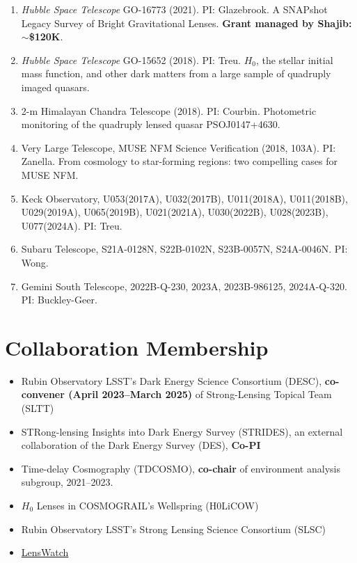\documentclass[margin, line]{res}
\begin{document}
\begin{resume}
\begin{enumerate}
\item \textit{Hubble Space Telescope} GO-16773 (2021). PI: Glazebrook. A SNAPshot Legacy Survey of Bright Gravitational Lenses. \textbf{Grant managed by Shajib: $\sim$\$120K}.
\item \textit{Hubble Space Telescope} GO-15652 (2018). PI: Treu. $H_0$, the stellar initial mass function, and other dark matters from a large sample of quadruply imaged quasars.
\item 2-m Himalayan Chandra Telescope (2018). PI: Courbin. Photometric monitoring of the quadruply lensed quasar PSOJ0147+4630.
\item Very Large Telescope, MUSE NFM Science Verification (2018, 103A). PI: Zanella. From cosmology to star-forming regions: two compelling cases for MUSE NFM.
\item Keck Observatory, U053(2017A), U032(2017B), U011(2018A),  U011(2018B), U029(2019A), U065(2019B), U021(2021A), U030(2022B), U028(2023B), U077(2024A). PI: Treu.
\item Subaru Telescope, S21A-0128N, S22B-0102N, S23B-0057N, S24A-0046N. PI: Wong.
\item Gemini South Telescope, 2022B-Q-230, 2023A, 2023B-986125, 2024A-Q-320. PI: Buckley-Geer.
\end{enumerate}

\section{\sc Collaboration Membership}
\begin{itemize}
	\item Rubin Observatory LSST's Dark Energy Science Consortium (DESC), \textbf{co-convener (April 2023--March 2025)} of Strong-Lensing Topical Team (SLTT) 
	\item STRong-lensing Insights into Dark Energy Survey (STRIDES), an external collaboration of the Dark Energy Survey (DES), \textbf{Co-PI}
	\item Time-delay Cosmography (TDCOSMO), \textbf{co-chair} of environment analysis subgroup, 2021--2023.
	\item $H_0$ Lenses in COSMOGRAIL's Wellspring (H0LiCOW)
	\item Rubin Observatory LSST's Strong Lensing Science Consortium (SLSC)
	\item \href{https://www.lenswatch.org/}{LensWatch}
\end{itemize}


\end{resume}
\end{document}
